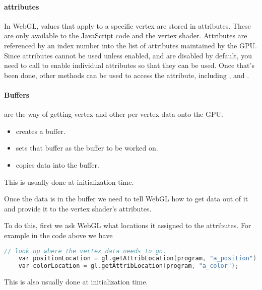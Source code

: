 \paragraph{attributes} In WebGL, values that apply to a specific vertex are stored in attributes. These are only available to the JavaScript code and the vertex shader. Attributes are referenced by an index number into the list of attributes maintained by the GPU. 
Since attributes cannot be used unless enabled, and are disabled by default, you need to call  to enable individual attributes so that they can be used. Once that's been done, other methods can be used to access the attribute, including , and .

\paragraph{Buffers} are the way of getting vertex and other per vertex data onto the GPU. 
\begin{itemize}
    \item {} creates a buffer. 
    \item {} sets that buffer as the buffer to be worked on. 
    \item {} copies data into the buffer. 
\end{itemize}
This is usually done at initialization time.

Once the data is in the buffer we need to tell WebGL how to get data out of it and provide it to the vertex shader's attributes.

To do this, first we ask WebGL what locations it assigned to the attributes. For example in the code above we have
\begin{lstlisting}[language=c]
    // look up where the vertex data needs to go.
    var positionLocation = gl.getAttribLocation(program, "a_position");
    var colorLocation = gl.getAttribLocation(program, "a_color");
\end{lstlisting}
This is also usually done at initialization time.

